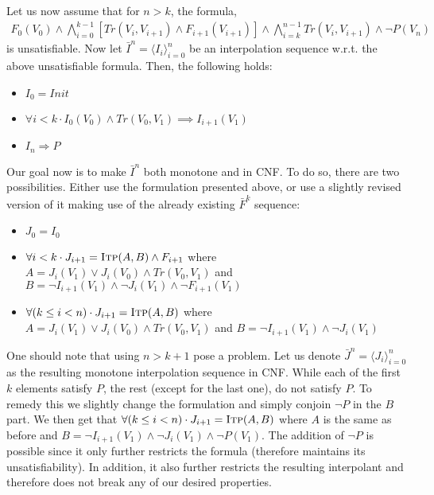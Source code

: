 \documentclass{article}
\newcommand{\itp}{\textsc{Itp}}
\newcommand{\Tr}{\mathit{Tr}}
\newcommand{\Init}{\mathit{Init}}
\begin{document}
Let us now assume that for $n > k$, the formula, 
\begin{align}
	F_0(V_0)\land\bigwedge_{i=0}^{k-1}[ \Tr(V_i,V_{i+1})\land F_{i+1}(V_{i+1})]\land\bigwedge_{i=k}^{n-1} \Tr(V_i,V_{i+1})\land\neg P(V_n)
\end{align}
is unsatisfiable. Now let $\bar{I}^n = \langle I_i \rangle_{i=0}^n$ be an interpolation sequence w.r.t. the above unsatisfiable formula. Then, the following holds:
\begin{itemize}
	\item $I_0 = \Init$
	\item $\forall i < k \cdot I_0(V_0) \land \Tr(V_0, V_1) \implies I_{i+1}(V_1)$
	\item $I_n\Rightarrow P$
\end{itemize}

Our goal now is to make $\bar{I}^n$ both monotone and in CNF. To do so, there are two possibilities. Either use the formulation presented above, or use a slightly revised version of it making use of the already existing $\bar{F}^k$ sequence:

\begin{itemize}
	\item $J_0 = I_0$
	\item $\forall i < k \cdot J_{i+1} = \itp (A,B)\land F_{i+1}$ where \\$A = J_i(V_1) \lor J_i(V_0) \land \Tr(V_0,V_1)$ and $B = \neg I_{i+1}(V_1) \land \neg J_i(V_1)\land\neg F_{i+1}(V_1)$
	\item $\forall (k\leq i < n) \cdot J_{i+1} = \itp (A,B)$ where \\$A = J_i(V_1) \lor J_i(V_0) \land \Tr(V_0,V_1)$ and $B = \neg I_{i+1}(V_1) \land \neg J_i(V_1)$
\end{itemize}

One should note that using $n > k+1$ pose a problem. Let us denote $\bar{J}^n = \langle J_i \rangle_{i=0}^n$ as the resulting monotone interpolation sequence in CNF. While each of the first $k$ elements satisfy $P$, the rest (except for the last one), do not satisfy $P$. To remedy this we slightly change the formulation and simply conjoin $\neg P$ in the $B$ part. We then get that $\forall (k\leq i < n) \cdot J_{i+1} = \itp (A,B)$ where $A$ is the same as before and $B = \neg I_{i+1}(V_1) \land \neg J_i(V_1)\land\neg P(V_1)$. The addition of $\neg P$ is possible since it only further restricts the formula (therefore maintains its unsatisfiability). In addition, it also further restricts the resulting interpolant and therefore does not break any of our desired properties.
\end{document}
